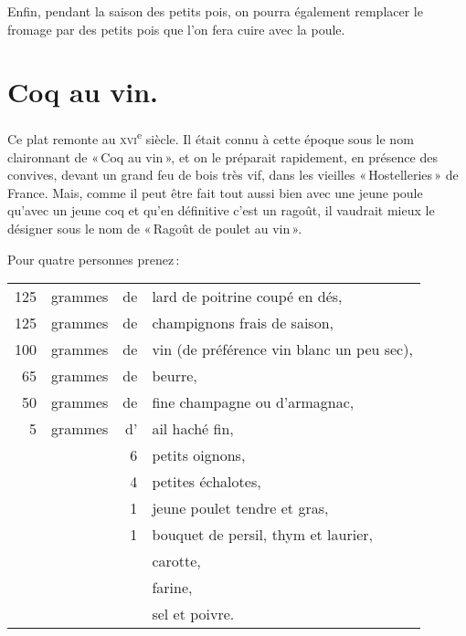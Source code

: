 Enfin, pendant la saison des petits pois, on pourra également remplacer le
fromage par des petits pois que l’on fera cuire avec la poule.

\section*{\centering Coq au vin.}
{}

Ce plat remonte au \textsc{xvi}\textsuperscript{e} siècle. Il était connu
à cette époque sous le nom claironnant de « Coq au vin », et on le préparait
rapidement, en présence des convives, devant un grand feu de bois très vif,
dans les vieilles « Hostelleries » de France. Mais, comme il peut être fait
tout aussi bien avec une jeune poule qu'avec un jeune coq et qu'en définitive
c'est un ragoût, il vaudrait mieux le désigner sous le nom de « Ragoût de
poulet au vin ».

Pour quatre personnes prenez :

\medskip

\footnotesize
\begin{longtable}{rrrp{16em}}
    125 & grammes & de & lard de poitrine coupé en dés,                                                   \\
    125 & grammes & de & champignons frais de saison,                                                     \\
    100 & grammes & de & vin (de préférence vin blanc un peu sec),                                        \\
     65 & grammes & de & beurre,                                                                          \\
     50 & grammes & de & fine champagne ou d'armagnac,                                                    \\
      5 & grammes & d' & ail haché fin,                                                                   \\
        &         &  6 & petits oignons,                                                                  \\
        &         &  4 & petites échalotes,                                                               \\
        &         &  1 & jeune poulet tendre et gras,                                                     \\
        &         &  1 & bouquet de persil, thym et laurier,                                              \\
        &         &    & carotte,                                                                         \\
        &         &    & farine,                                                                          \\
        &         &    & sel et poivre.                                                                   \\
\end{longtable}
\normalsize

